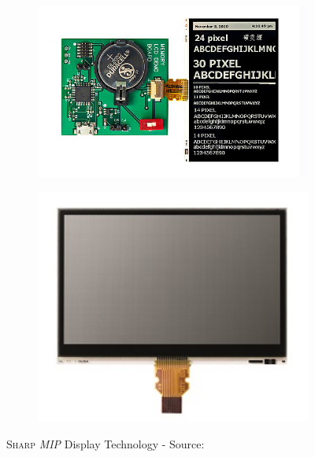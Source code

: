 \documentclass[report.tex]{subfiles}
\begin{document}
\begin{figure}[H]
\begin{subfigure}{.6\textwidth}
	\centering
	\includegraphics[width=1\textwidth]{Include/Figure/comp/csm_Sharp-MIP-3-16-inch-Edit_b0c527d887.jpg}
	\end{subfigure}
\begin{subfigure}{.4\textwidth}
	\centering
	\includegraphics[width=1\textwidth]{Include/Figure/comp/Sharp-Product-Memory-in-Pixel-LCD-Displays_smaller.jpg}
	\end{subfigure}
	\caption{\textsc{Sharp} \textit{MIP} Display Technology - Source:\cite{SHARPMIP}}
	\label{fig:Sharp_mip_1}
\end{figure}
\end{document}
